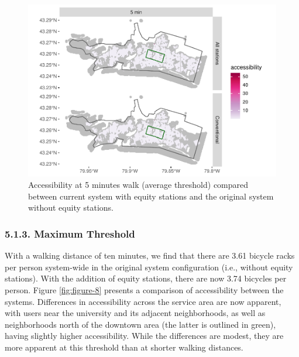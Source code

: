 \documentclass[]{elsarticle} %
\begin{document}
\begin{figure}

{\centering \includegraphics[width=0.9\linewidth]{Bike-share-spatial-equity_files/figure-latex/figure-7-1} 

}

\caption{Accessibility at 5 minutes walk (average threshold) compared between current system with equity stations and the original system without equity stations.}\label{fig:figure-7}
\end{figure}

\hypertarget{maximum-threshold}{%
\subsubsection{5.1.3. Maximum Threshold}\label{maximum-threshold}}

With a walking distance of ten minutes, we find that there are 3.61
bicycle racks per person system-wide in the original system
configuration (i.e., without equity stations). With the addition of
equity stations, there are now 3.74 bicycles per person. Figure
\ref{fig:figure-8} presents a comparison of accessibility between the
systems. Differences in accessibility across the service area are now
apparent, with users near the university and its adjacent neighborhoods,
as well as neighborhoods north of the downtown area (the latter is
outlined in green), having slightly higher accessibility. While the
differences are modest, they are more apparent at this threshold than at
shorter walking distances.
\end{document}
